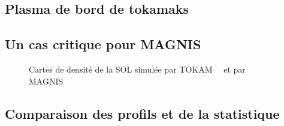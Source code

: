 \begin{refsection}
\section{Plasma de bord de tokamaks}
\subsection{Un cas critique pour MAGNIS}

\begin{figure}[!htbp]
  \centering
    \caption{Cartes de densité de la SOL simulée par
    TOKAM~~ et par MAGNIS~}
    \label{pandas}
\end{figure}
\subsection{Comparaison des profils et de la statistique}


\end{refsection}
